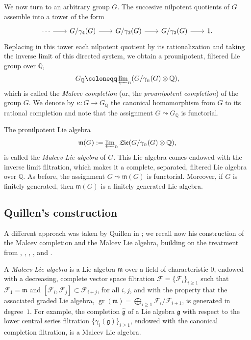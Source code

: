 \documentclass{article}
\numberwithin{equation}{section}
\theoremstyle{definition}
\newcommand{\Q}{\mathbb{Q}}
\newcommand{\F}{\mathcal{F}}
\newcommand{\g}{{\mathfrak{g}}}
\newcommand{\m}{{\mathfrak{m}}}
\DeclareMathOperator{\gr}{gr}
\begin{document}
We now turn to an arbitrary group $G$. The succesive nilpotent quotients 
of $G$ assemble into a tower of the form
\vspace*{-2pt}
\begin{equation}
\label{eq:nilp-tower}
\begin{tikzcd}[column sep=20]
\cdots   \ar[r]& G/\gamma _4 (G)\ar[r]& G/\gamma_3 (G)  
\ar[r]& G/\gamma_2(G) \ar[r]&  1.
\end{tikzcd}
\end{equation}
Replacing in this tower each nilpotent quotient 
by its rationalization and taking 
the inverse limit of this directed system, we obtain 
a prounipotent, filtered Lie group over $\Q$,
\begin{equation}
\label{eq:malcev-group}
G_{\Q}\coloneqq \varprojlim\nolimits_{n} (G/\gamma_{n}( G)\otimes \Q),
\end{equation}
which is called the {\em Malcev completion}\/ (or, the {\em prounipotent 
completion}) of the group $G$.  
We denote by $\kappa\colon G\to G_{\Q}$ the canonical homomorphism 
from $G$ to its rational completion and note that the assignment $G\leadsto 
G_{\Q}$ is functorial. 

The pronilpotent Lie algebra 
\vspace*{-2pt}
\begin{equation}
\label{eq:malcevLie}
\m(G):=\varprojlim\nolimits_{n} \mathfrak{Lie}(G/\gamma_{n} (G)\otimes \Q),
\end{equation}
is called the {\em Malcev Lie algebra}\/ of $G$.  This Lie algebra comes 
endowed with the inverse limit filtration, which makes it a complete, 
separated, filtered Lie algebra over $\Q$. As before, the assignment 
$G\leadsto \m(G)$ is functorial. Moreover, if $G$ is finitely generated, 
then $\m(G)$ is a finitely generated Lie algebra.

\subsection{Quillen's construction}
\label{subsec:malcev}

A different approach was taken by Quillen in \cite[Appendix~A]{Qu69}; 
we recall now his construction of the Malcev completion and the 
Malcev Lie algebra, building on the treatment from 
\cite{PS-imrn04}, \cite{PS-formal}, \cite{Massuyeau12}, 
\cite{FHT}, and \cite{SW-forum}. 

A {\em Malcev Lie algebra}\/ is a Lie algebra $\m$ over a field  
of characteristic $0$, endowed with a decreasing, complete 
vector space filtration $\F=\{\F_i\}_{i\ge 1}$ such that $\F_1=\m$ and   
$[\F_i,\F_j]\subset \F_{i+j}$, for all $i, j$, and with the property that the 
associated graded Lie algebra, $\gr(\m)=\bigoplus _{i\ge 1}
\F_i/\F_{i+1}$, is generated in degree~$1$. For example, the 
completion $\widehat{\g}$ of a Lie algebra $\g$ with respect to 
the lower central series filtration $\{\gamma_i (\g)\}_{i\ge 1}$,  
endowed with the canonical completion filtration, is a Malcev Lie algebra. 
\end{document}

